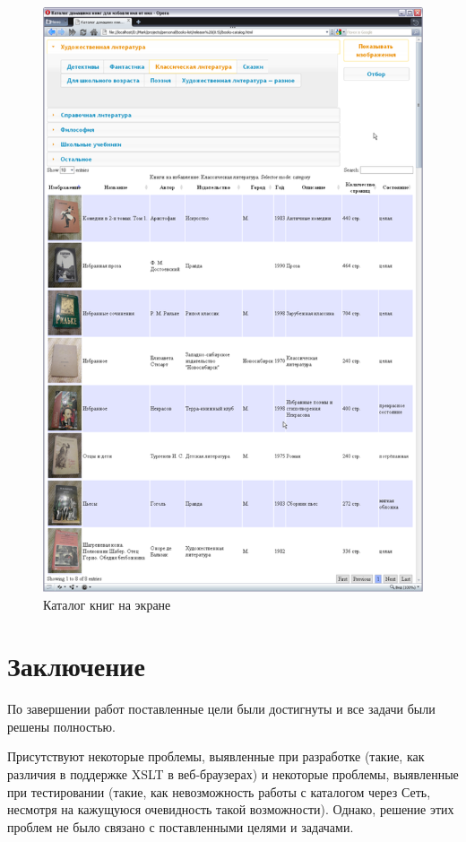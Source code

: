 \documentclass[a4paper,14pt,oneside]{extreport}
\begin{document}
\begin{figure}
\begin{center}
\includegraphics{book-catalog-screenshot.eps}
\end{center}
\caption{Каталог книг на экране}\label{book-catalog-screenshot}
\end{figure}

\chapter{Заключение}
По завершении работ поставленные цели были достигнуты и все задачи были решены полностью.

Присутствуют некоторые проблемы, выявленные при разработке (такие, как различия в поддержке XSLT в веб-браузерах) и некоторые проблемы, выявленные при тестировании (такие, как невозможность работы с каталогом через Сеть, несмотря на кажущуюся очевидность такой возможности). Однако, решение этих проблем не было связано с поставленными целями и задачами.
\end{document}
